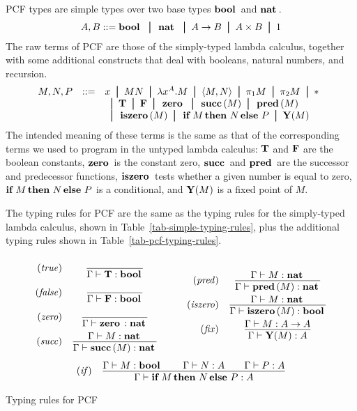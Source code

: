 \documentclass{article}
\begin{document}
PCF types are simple types over two base types $\mathop{\textbf{\bf bool}\,}$ and $\mathop{\textbf{\bf nat}\,}$.
\[ A,B \bnf \boolt \bor \natt \bor A\to B\bor A\times
B\bor 1
\]
The raw terms of PCF are those of the simply-typed lambda calculus,
together with some additional constructs that deal with booleans,
natural numbers, and recursion.
\[ \begin{array}{@{}lll}
  M,N,P &\bnf& 
  x \bor MN \bor \lamabs{x}{A}.M
  \bor \pair{M,N} \bor \proj1 M \bor \proj2 M \bor \unit \\
  &&\bor \truet \bor \falset \bor \zerot \bor \succt(M) \bor \predt(M) \\
  &&\bor \iszerot(M) \bor \ite{M}{N}{P} \bor \Y(M)
\end{array}
\]
The intended meaning of these terms is the same as that of the
corresponding terms we used to program in the untyped lambda calculus:
${\bf T}$ and ${\bf F}$ are the boolean constants, $\mathop{\textbf{\bf zero}\,}$ is the
constant zero, $\mathop{\textbf{\bf succ}\,}$ and $\mathop{\textbf{\bf pred}\,}$ are the successor and predecessor
functions, $\mathop{\textbf{\bf iszero}\,}$ tests whether a given number is equal to zero,
$\mathop{\textbf{\bf if}\,}M\mathop{\textbf{\bf then}\,}N\mathop{\textbf{\bf else}\,}P$ is a conditional, and ${\bf Y}(M)$ is a fixed point of $M$.

The typing rules for PCF are the same as the typing rules for the
simply-typed lambda calculus, shown in
Table~\ref{tab-simple-typing-rules}, plus the additional typing rules
shown in Table~\ref{tab-pcf-typing-rules}.
\begin{table*}[tbp]
\[
\begin{array}{rc}
  \trule{true}  & \deriv{}{\Gamma\tj\truet: \boolt}
  \nl  \trule{false}  & \deriv{}{\Gamma\tj\falset: \boolt}
  \nl  \trule{zero}  & \deriv{}{\Gamma\tj\zerot: \natt}
  \nl  \trule{succ}  & \deriv{\Gamma\tj M: \natt}{\Gamma\tj\succt(M): \natt}
\end{array}
\sep
\begin{array}{rc}
       \trule{pred}  & \deriv{\Gamma\tj M: \natt}{\Gamma\tj\predt(M): \natt}
  \nl  \trule{iszero} &\deriv{\Gamma\tj M: \natt}{\Gamma\tj\iszerot(M): \boolt}
  \nl  \trule{fix} & \deriv{\Gamma\tj M:A\to A}{\Gamma\tj \Y(M):A}
\end{array}
\]
\[
\begin{array}{rc}
  \trule{if} &
  \deriv{\Gamma\tj M: \boolt\sep\Gamma\tj N:A\sep\Gamma\tj P:A}
  {\Gamma\tj \ite{M}{N}{P}:A}
\end{array}
\]
\caption{Typing rules for PCF}
\label{tab-pcf-typing-rules}
\end{table*}
\end{document}
